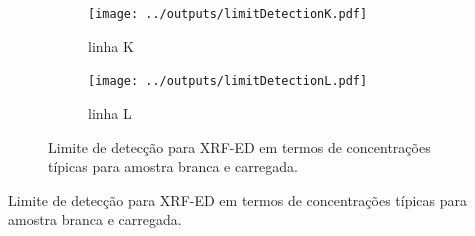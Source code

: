 \begin{figure}[H]
  \begin{subfigure}[b]{0.5\textwidth}
    \texttt{[image: ../outputs/limitDetectionK.pdf]}
    \caption{linha K}
  \end{subfigure}%
  \begin{subfigure}[b]{0.5\textwidth}
    \texttt{[image: ../outputs/limitDetectionL.pdf]}
    \caption{linha L}
  \end{subfigure}
  \caption{Limite de detecção para XRF-ED em termos de concentrações típicas 
           para amostra branca e carregada.
           \label{table:ld}}
\end{figure}

\newpage
\begin{table}[H]
  \centering
  \caption{Limite de detecção para XRF-ED em termos de concentrações típicas 
           para amostra branca e carregada. \label{table:LD}}
  
\end{table}
